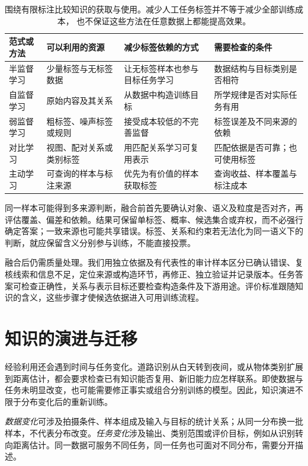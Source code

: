 \begin{table}[htbp]
  \centering
  \small
  \begin{tabularx}{\linewidth}{@{}lXXX@{}}
    \toprule
    \textbf{范式或方法} & \textbf{可以利用的资源} & \textbf{减少标签依赖的方式} & \textbf{需要检查的条件} \\
    \midrule
    半监督学习 & 少量标签与无标签数据 & 让无标签样本也参与目标任务学习 & 数据结构与目标类别是否相符 \\
    自监督学习 & 原始内容及其关系 & 从数据中构造训练目标 & 所学规律是否对实际任务有用 \\
    弱监督学习 & 粗标签、噪声标签或规则 & 接受成本较低的不完善监督 & 标签误差及不同来源的依赖 \\
    对比学习 & 视图、配对关系或类别标签 & 用匹配关系学习可复用表示 & 匹配依据是否可靠；也可使用标签 \\
    主动学习 & 可查询的样本与标注来源 & 优先为有价值的样本获取标签 & 查询收益、样本覆盖与标注成本 \\
    \bottomrule
  \end{tabularx}
  \caption{围绕有限标注比较知识的获取与使用。减少人工任务标签并不等于减少全部训练成本，
  也不保证这些方法在任意数据上都能提高效果。}
  \label{tab:efficient-knowledge-use-comparison}
\end{table}
\FloatBarrier

同一样本可能得到多来源判断，融合前首先要确认对象、语义及粒度是否对齐，再评估覆盖、偏差和依赖。结果可保留单标签、概率、候选集合或弃权，而不必强行确定答案；一致来源也可能共享错误。标签、关系和约束若无法化为同一语义下的判断，就应保留含义分别参与训练，不能直接投票。

融合后仍需质量处理。我们用独立依据及有代表性的审计样本区分已确认错误、复核线索和信息不足，定位来源或构造环节，再修正、独立验证并记录版本。任务答案可检查正确性，关系与表示目标还要检查构造条件及下游用途。评价标准跟随知识的含义，这些步骤才使候选依据进入可用训练流程。

\section{知识的演进与迁移}
\label{sec:knowledge-evolution-and-transfer-overview}

经验利用还会遇到时间与任务变化。道路识别从白天转到夜间，或从物体类别扩展到距离估计，都会要求检查已有知识能否复用、新旧能力应怎样联系。即使数据与任务未明显改变，也可能需要修正事实或组合分别训练的模型。因此，知识演进不限于分布变化后的重新训练。

\emph{数据变化}可涉及拍摄条件、样本组成及输入与目标的统计关系；从同一分布换一批样本，不代表分布改变。\emph{任务变化}涉及输出、类别范围或评价目标，例如从识别转向距离估计。同一数据可服务不同任务，同一任务也可面对不同分布，需要分开描述。

